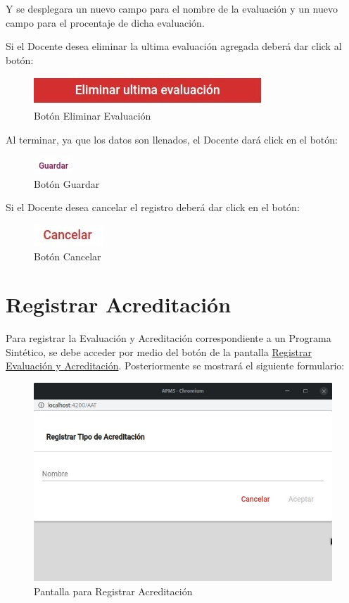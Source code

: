\documentclass[10pt]{book}
\begin{document}
Y se desplegara un nuevo campo para el nombre de la evaluación y un nuevo campo para el procentaje de dicha evaluación.

Si el Docente desea eliminar la ultima evaluación agregada deberá dar click al botón: 


\begin{figure}[!h]
    \centering
    \includegraphics[width=0.3\linewidth]{images/SP6/BotonEliEval.jpeg}
    \caption{Botón Eliminar Evaluación} 
\end{figure}


Al terminar, ya que los datos son llenados, el Docente dará click en el botón:

\begin{figure}[!hbtp]
    \centering
    \includegraphics[width=0.1\linewidth]{images/SP6/BotonGuardar.jpeg}
    \caption{Botón Guardar} 
\end{figure}

Si el Docente desea cancelar el registro deberá dar click en el botón:

\begin{figure}[!hbtp]
    \centering
    \includegraphics[width=0.1\linewidth]{images/SP6/BotonCancelar.jpeg}
    \caption{Botón Cancelar} 
\end{figure}


\pagebreak
\hypertarget{RegAcre}{\section{Registrar Acreditación}}


Para registrar la Evaluación y Acreditación correspondiente a un Programa Sintético, se debe acceder por medio del botón  de la pantalla \hyperlink{RegistrarEC}{Registrar Evaluación y Acreditación}. Posteriormente se mostrará el siguiente formulario: 


\begin{figure}[!h]
    \centering
    \hypertarget{RegistrarAcreditacion}{\includegraphics[width=0.5\linewidth]{images/SP6/9.jpeg}}
    \caption{Pantalla para Registrar Acreditación}
\end{figure}
\end{document}
